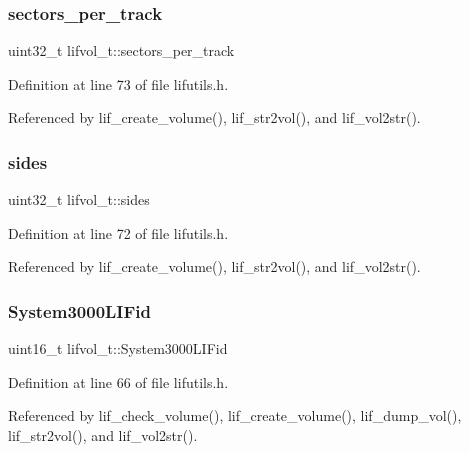 \subsubsection{\texorpdfstring{sectors\+\_\+per\+\_\+track}{sectors\_per\_track}}
{\footnotesize\ttfamily uint32\+\_\+t lifvol\+\_\+t\+::sectors\+\_\+per\+\_\+track}



Definition at line 73 of file lifutils.\+h.



Referenced by lif\+\_\+create\+\_\+volume(), lif\+\_\+str2vol(), and lif\+\_\+vol2str().

\mbox{\label{structlifvol__t_a5b8ecfb441b010f69cb90b923cc50719}} 
\subsubsection{\texorpdfstring{sides}{sides}}
{\footnotesize\ttfamily uint32\+\_\+t lifvol\+\_\+t\+::sides}



Definition at line 72 of file lifutils.\+h.



Referenced by lif\+\_\+create\+\_\+volume(), lif\+\_\+str2vol(), and lif\+\_\+vol2str().

\mbox{\label{structlifvol__t_a98097f8c951448cbab6019b7b703e4d0}} 
\subsubsection{\texorpdfstring{System3000\+L\+I\+Fid}{System3000LIFid}}
{\footnotesize\ttfamily uint16\+\_\+t lifvol\+\_\+t\+::\+System3000\+L\+I\+Fid}



Definition at line 66 of file lifutils.\+h.



Referenced by lif\+\_\+check\+\_\+volume(), lif\+\_\+create\+\_\+volume(), lif\+\_\+dump\+\_\+vol(), lif\+\_\+str2vol(), and lif\+\_\+vol2str().

\mbox{\label{structlifvol__t_aae9e5135f98b80312eb785ac3747fc31}} 
